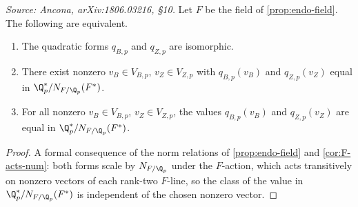 \begin{corollary}
  \label{cor:norm-criterion}
  \textit{Source: Ancona, arXiv:1806.03216, \S10.}
  Let \(F\) be the field of \cref{prop:endo-field}. The following are
  equivalent.
  \begin{enumerate}
    \item The quadratic forms \(q_{B,p}\) and \(q_{Z,p}\) are isomorphic.
    \item There exist nonzero \(v_B \in V_{B,p}\), \(v_Z \in V_{Z,p}\) with
      \(q_{B,p}(v_B)\) and \(q_{Z,p}(v_Z)\) equal in
      \(\Q_p^*/N_{F/\Q_p}(F^*)\).
    \item For all nonzero \(v_B \in V_{B,p}\), \(v_Z \in V_{Z,p}\), the values
      \(q_{B,p}(v_B)\) and \(q_{Z,p}(v_Z)\) are equal in
      \(\Q_p^*/N_{F/\Q_p}(F^*)\).
  \end{enumerate}
\end{corollary}

\begin{proof}
  A formal consequence of the norm relations of \cref{prop:endo-field} and
  \cref{cor:F-acts-num}: both forms
  scale by \(N_{F/\Q_p}\) under the \(F\)-action, which acts transitively on
  nonzero vectors of each rank-two \(F\)-line, so the class of the value in
  \(\Q_p^*/N_{F/\Q_p}(F^*)\) is independent of the chosen nonzero vector.
\end{proof}

